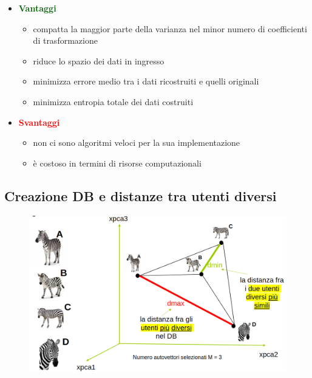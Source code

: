 \documentclass{report}
\begin{document}
\begin{itemize}
    \item \textcolor{darkgreen}{\textbf{Vantaggi}}
    \begin{itemize}
        \item compatta la maggior parte della varianza nel minor numero di coefficienti di trasformazione 
        \item riduce lo spazio dei dati in ingresso
        \item minimizza errore medio tra i dati ricostruiti e quelli originali 
        \item minimizza entropia totale dei dati costruiti 
    \end{itemize}
    \item \textcolor{red}{\textbf{Svantaggi}}
    \begin{itemize}
        \item non ci sono algoritmi veloci per la sua implementazione 
        \item è costoso in termini di risorse computazionali
    \end{itemize}
\end{itemize}

\newpage
\subsection{Creazione DB e distanze tra utenti diversi}
\begin{figure}[H]
    \centering
    \includegraphics[width=1\linewidth]{images/distance1.png}
\end{figure}
\end{document}
